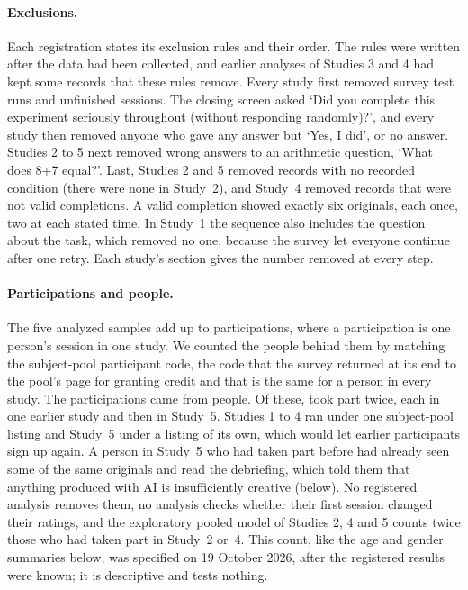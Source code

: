 \paragraph*{Exclusions.}
Each registration states its exclusion rules and their order. The rules were written after the data had been collected, and earlier analyses of Studies 3 and 4 had kept some records that these rules remove. Every study first removed survey test runs and unfinished sessions. The closing screen asked `Did you complete this experiment seriously throughout (without responding randomly)?', and every study then removed anyone who gave any answer but `Yes, I did', or no answer. Studies 2 to 5 next removed wrong answers to an arithmetic question, `What does 8+7 equal?'. Last, Studies 2 and 5 removed records with no recorded condition (there were none in Study~2), and Study~4 removed records that were not valid completions. A valid completion showed exactly six originals, each once, two at each stated time. In Study~1 the sequence also includes the question about the task, which removed no one, because the survey let everyone continue after one retry. Each study's section gives the number removed at every step.

\paragraph*{Participations and people.}
The five analyzed samples add up to \NTotal{} participations, where a participation is one person's session in one study. We counted the people behind them by matching the subject-pool participant code, the code that the survey returned at its end to the pool's page for granting credit and that is the same for a person in every study. The \NTotal{} participations came from \NPeople{} people. Of these, \NPeopleRepeat{} took part twice, each in one earlier study and then in Study~5. Studies 1 to 4 ran under one subject-pool listing and Study~5 under a listing of its own, which would let earlier participants sign up again. A person in Study~5 who had taken part before had already seen some of the same originals and read the debriefing, which told them that anything produced with AI is insufficiently creative (below). No registered analysis removes them, no analysis checks whether their first session changed their ratings, and the exploratory pooled model of Studies 2, 4 and 5 counts twice those who had taken part in Study~2 or~4. This count, like the age and gender summaries below, was specified on 19 October 2026, after the registered results were known; it is descriptive and tests nothing.


